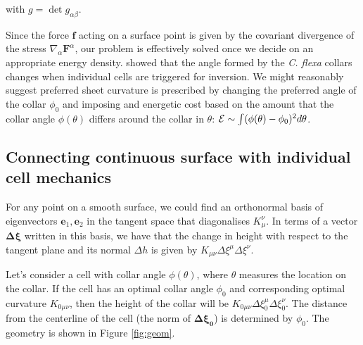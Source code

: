 \noindent with $g = \det{g_{\alpha\beta}}$.

Since the force $\bm{f}$ acting on a surface point is given by the covariant divergence of the stress $\nabla_\alpha \bm{F}^\alpha$, our problem is effectively solved once we decide on an appropriate energy density. \citet{brunet2019} showed that the angle formed by the \textit{C. flexa} collars changes when individual cells are triggered for inversion. We might reasonably suggest preferred sheet curvature is prescribed by changing the preferred angle of the collar $\phi_0$ and imposing and energetic cost based on the amount that the collar angle $\phi(\theta)$ differs around the collar in $\theta$: $\mathcal{E} \sim \int (\phi(\theta) - \phi_0)^2 d\theta$.

\subsection{Connecting continuous surface with individual cell mechanics}

For any point on a smooth surface, we could find an orthonormal basis of eigenvectors $\bm{e}_1, \bm{e}_2$ in the tangent space that diagonalises $K_\mu^\nu$. In terms of a vector $\bm{\Delta \xi}$ written in this basis, we have that the change in height with respect to the tangent plane and its normal $\Delta h$ is given by $K_{\mu\nu}\Delta\xi^\mu\Delta\xi^\nu$.

Let's consider a cell with collar angle $\phi(\theta)$, where $\theta$ measures the location on the collar. If the cell has an optimal collar angle $\phi_0$ and corresponding optimal curvature $K_{0\mu\nu}$, then the height of the collar will be $K_{0\mu\nu}\Delta\xi_0^\mu\Delta\xi_0^\nu$. The distance from the centerline of the cell (the norm of $\bm{\Delta\xi_0}$) is determined by $\phi_0$. The geometry is shown in Figure \ref{fig:geom}.

